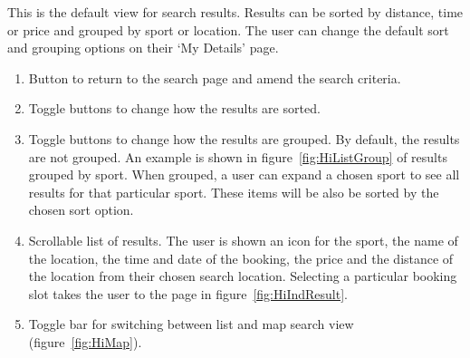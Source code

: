
This is the default view for search results. Results can be sorted by distance,
time or price and grouped by sport or location. The user can change the default
sort and grouping options on their `My Details' page.
\begin{enumerate}
	\item Button to return to the search page and amend the search criteria.
	\item Toggle buttons to change how the results are sorted.
	\item Toggle buttons to change how the results are grouped. By default, the
		results are not grouped. An example is shown in
		figure~\ref{fig:HiListGroup} of results grouped by sport. When grouped,
		a user can expand a chosen sport to see all results for that particular
		sport. These items will be also be sorted by the chosen sort option.
	\item Scrollable list of results. The user is shown an icon for the sport,
		the name of the location, the time and date of the booking, the price
		and the distance of the location from their chosen search location.
		Selecting a particular booking slot takes the user to the page in
		figure~\ref{fig:HiIndResult}.
	\item Toggle bar for switching between list and map search view
		(figure~\ref{fig:HiMap}).
\end{enumerate}

